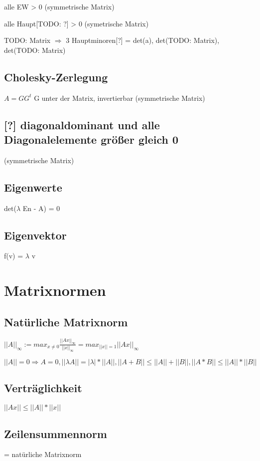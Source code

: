 \documentclass[12pt,a4paper]{article} %
\begin{document}
	alle EW > 0 (symmetrische Matrix)
	
	alle Haupt[TODO: ?] > 0 (symetrische Matrix)
	
	TODO: Matrix 	$\Rightarrow$ 3 Hauptminoren[?] = det(a), det(TODO: Matrix), det(TODO: Matrix)
	
	\subsection{Cholesky-Zerlegung}
	$A = GG^t$ G unter der Matrix, invertierbar (symmetrische Matrix)
	
	\subsection{[?] diagonaldominant und alle Diagonalelemente größer gleich 0}
	(symmetrische Matrix)
	
	\subsection{Eigenwerte}
	det($\lambda$ En - A) = 0
	
	\subsection{Eigenvektor}
	f(v) = $\lambda$ v
		
	\newpage
	
	\section{Matrixnormen}
	
	\subsection{Natürliche Matrixnorm}
	
	$||A||_\infty := max_{x \ne 0} \frac{||Ax||_\infty}{||x||_\infty} = max_{||x|| = 1}||Ax||_\infty$
	
	$||A|| = 0 \Rightarrow A = 0, ||\lambda A|| = |\lambda|*||A||, ||A+B|| \le ||A|| + ||B||, ||A*B|| \le ||A|| * ||B||$
	
	\subsection{Verträglichkeit}
	$||Ax|| \le ||A|| * ||x||$
	
	\subsection{Zeilensummennorm}
	= natürliche Matrixnorm
	
\end{document}
